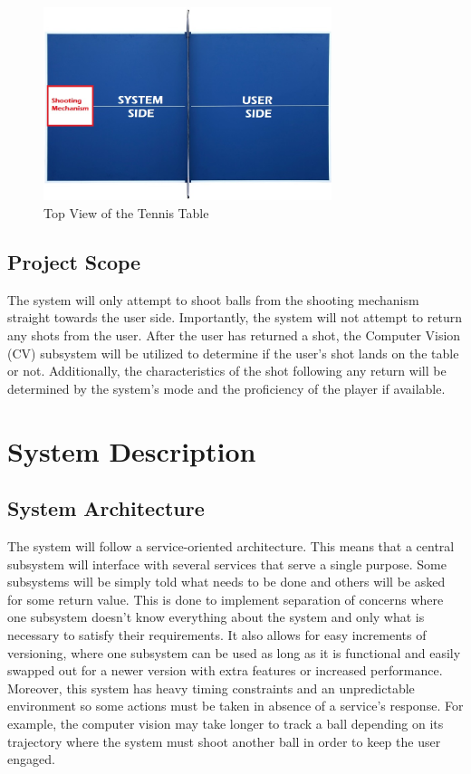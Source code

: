 \documentclass[11pt]{article}
\begin{document}
\begin{figure}[H]
   \centering
   \includegraphics[width=0.75\textwidth]{img/Table-Tennis-Top-View.png} %
   \caption{Top View of the Tennis Table}
   \label{fig:table-tennis-top-view}
\end{figure}
\subsection{Project Scope}
The system will only attempt to shoot balls from the shooting mechanism straight towards the user side. Importantly, the system will not attempt to return any shots from the user. After the user has returned a shot, the Computer Vision (CV) subsystem will be utilized to determine if the user's shot lands on the table or not. Additionally, the characteristics of the shot following any return will be determined by the system's mode and the proficiency of the player if available.
\section{System Description}
\subsection{System Architecture}
The system will follow a service-oriented architecture. This means that a central subsystem will interface with several services that serve a single purpose. Some subsystems will be simply told what needs to be done and others will be asked for some return value. This is done to implement separation of concerns where one subsystem doesn't know everything about the system and only what is necessary to satisfy their requirements. It also allows for easy increments of versioning, where one subsystem can be used as long as it is functional and easily swapped out for a newer version with extra features or increased performance. Moreover, this system has heavy timing constraints and an unpredictable environment so some actions must be taken in absence of a service's response. For example, the computer vision may take longer to track a ball depending on its trajectory where the system must shoot another ball in order to keep the user engaged.
\end{document}
